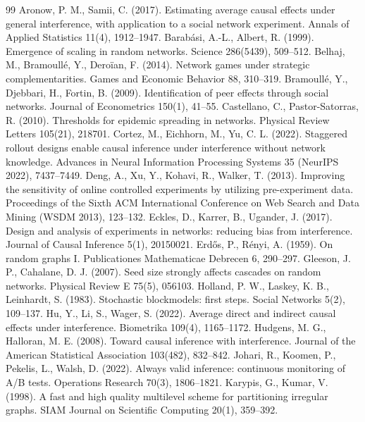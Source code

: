 \documentclass[final,5p,times,twocolumn,number]{elsarticle}
\begin{document}
\FloatBarrier
\makeatletter\global\@colroom\@colht\global\vsize\@colht\makeatother
\begingroup\footnotesize
\begin{thebibliography}{99}
 Aronow, P. M., Samii, C. (2017). Estimating average causal effects under general interference, with application to a social network experiment. Annals of Applied Statistics 11(4), 1912–1947.
 Barabási, A.-L., Albert, R. (1999). Emergence of scaling in random networks. Science 286(5439), 509–512.
 Belhaj, M., Bramoullé, Y., Deroïan, F. (2014). Network games under strategic complementarities. Games and Economic Behavior 88, 310–319.
 Bramoullé, Y., Djebbari, H., Fortin, B. (2009). Identification of peer effects through social networks. Journal of Econometrics 150(1), 41–55.
 Castellano, C., Pastor-Satorras, R. (2010). Thresholds for epidemic spreading in networks. Physical Review Letters 105(21), 218701.
 Cortez, M., Eichhorn, M., Yu, C. L. (2022). Staggered rollout designs enable causal inference under interference without network knowledge. Advances in Neural Information Processing Systems 35 (NeurIPS 2022), 7437–7449.
 Deng, A., Xu, Y., Kohavi, R., Walker, T. (2013). Improving the sensitivity of online controlled experiments by utilizing pre-experiment data. Proceedings of the Sixth ACM International Conference on Web Search and Data Mining (WSDM 2013), 123–132.
 Eckles, D., Karrer, B., Ugander, J. (2017). Design and analysis of experiments in networks: reducing bias from interference. Journal of Causal Inference 5(1), 20150021.
 Erdős, P., Rényi, A. (1959). On random graphs I. Publicationes Mathematicae Debrecen 6, 290–297.
 Gleeson, J. P., Cahalane, D. J. (2007). Seed size strongly affects cascades on random networks. Physical Review E 75(5), 056103.
 Holland, P. W., Laskey, K. B., Leinhardt, S. (1983). Stochastic blockmodels: first steps. Social Networks 5(2), 109–137.
 Hu, Y., Li, S., Wager, S. (2022). Average direct and indirect causal effects under interference. Biometrika 109(4), 1165–1172.
 Hudgens, M. G., Halloran, M. E. (2008). Toward causal inference with interference. Journal of the American Statistical Association 103(482), 832–842.
 Johari, R., Koomen, P., Pekelis, L., Walsh, D. (2022). Always valid inference: continuous monitoring of A/B tests. Operations Research 70(3), 1806–1821.
 Karypis, G., Kumar, V. (1998). A fast and high quality multilevel scheme for partitioning irregular graphs. SIAM Journal on Scientific Computing 20(1), 359–392.

\end{thebibliography}
\end{document}
